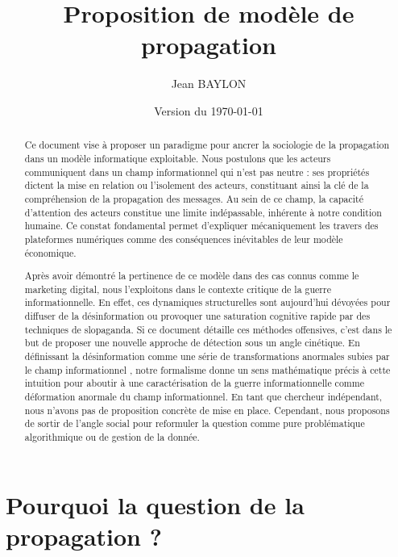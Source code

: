 \documentclass[11pt]{article}
\author{Jean BAYLON}
\title{Proposition de modèle de propagation}
\date{Version du \today{}}
\begin{document}
	\maketitle
	
	\begin{abstract}
		Ce document vise à proposer un paradigme pour ancrer la sociologie de la propagation dans un modèle informatique exploitable. Nous postulons que les acteurs communiquent dans un champ informationnel qui n'est pas neutre : ses propriétés dictent la mise en relation ou l'isolement des acteurs, constituant ainsi la clé de la compréhension de la propagation des messages. Au sein de ce champ, la capacité d'attention des acteurs constitue une limite indépassable, inhérente à notre condition humaine. Ce constat fondamental permet d'expliquer mécaniquement les travers des plateformes numériques comme des conséquences inévitables de leur modèle économique.  
		
		Après avoir démontré la pertinence de ce modèle dans des cas connus comme le marketing digital, nous l'exploitons dans le contexte critique de la guerre informationnelle. En effet, ces dynamiques structurelles sont aujourd'hui dévoyées pour diffuser de la désinformation ou provoquer une saturation cognitive rapide par des techniques de slopaganda. Si ce document détaille ces méthodes offensives, c'est dans le but de proposer une nouvelle approche de détection sous un angle cinétique. En définissant la désinformation comme une série de transformations anormales subies par le champ informationnel , notre formalisme donne un sens mathématique précis à cette intuition pour aboutir à une caractérisation de la guerre informationnelle comme déformation anormale du champ informationnel. En tant que chercheur indépendant, nous n'avons pas de proposition concrète de mise en place. Cependant, nous proposons de sortir de l'angle social pour reformuler la question comme pure problématique algorithmique ou de gestion de la donnée. 
	\end{abstract}
	\clearpage
	\tableofcontents
	\clearpage
	
	\section{Pourquoi la question de la propagation ?}
	
\end{document}
